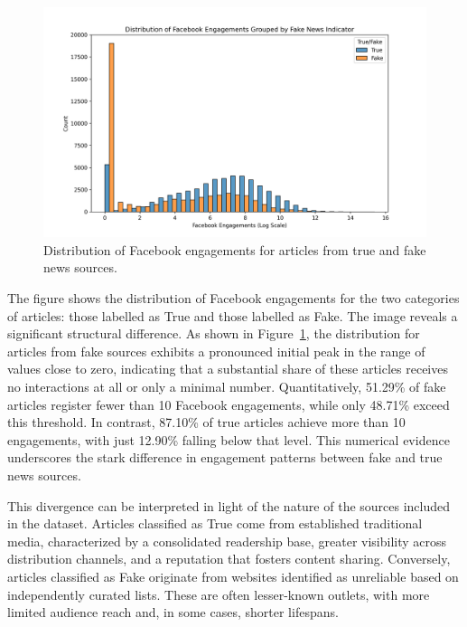 \documentclass[a4paper,twoside,12pt]{book}
\begin{document}
\begin{figure}[htbp]
\centering
\includegraphics[width=\textwidth]{./img/engagements_by_fake_news.png}
\caption{Distribution of Facebook engagements for articles from true and fake news sources.}
\label{fig:fb_engagements_distribution}
\end{figure}
	
The figure shows the distribution of Facebook engagements for the two categories of articles: those labelled as True and those labelled as Fake. The image reveals a significant structural difference. As shown in Figure~\ref{fig:fb_engagements_distribution}, the distribution for articles from fake sources exhibits a pronounced initial peak in the range of values close to zero, indicating that a substantial share of these articles receives no interactions at all or only a minimal number. Quantitatively, 51.29\% of fake articles register fewer than 10 Facebook engagements, while only 48.71\% exceed this threshold. In contrast, 87.10\% of true articles achieve more than 10 engagements, with just 12.90\% falling below that level. This numerical evidence underscores the stark difference in engagement patterns between fake and true news sources.  

This divergence can be interpreted in light of the nature of the sources included in the dataset. Articles classified as True come from established traditional media, characterized by a consolidated readership base, greater visibility across distribution channels, and a reputation that fosters content sharing. Conversely, articles classified as Fake originate from websites identified as unreliable based on independently curated lists. These are often lesser-known outlets, with more limited audience reach and, in some cases, shorter lifespans.  
\end{document}
